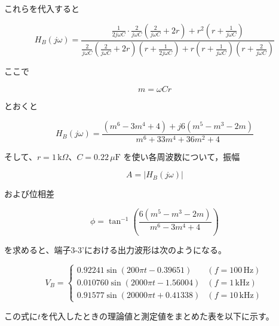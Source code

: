 \documentclass[article]{jlreq}
\begin{document}
これらを代入すると

\begin{equation}
H_B(j\omega)
=
\frac{
\frac1{2j\omega C}
\cdot
\frac2{j\omega C}
\left(
\frac2{j\omega C}+2r
\right)
+
r^2
\left(
r+\frac1{j\omega C}
\right)
}{
\frac2{j\omega C}
\left(
\frac2{j\omega C}+2r
\right)
\left(
r+\frac1{2j\omega C}
\right)
+
r
\left(
r+\frac1{j\omega C}
\right)
\left(
r+\frac2{j\omega C}
\right)
}
\end{equation}

ここで


\begin{equation}
m=\omega Cr
\end{equation}

とおくと

\begin{equation}
H_B(j\omega)
=
\frac{
(m^6-3m^4+4)
+j6(m^5-m^3-2m)
}{
m^6+33m^4+36m^2+4
}
\end{equation}

そして、$r = 1\,\text{k}\Omega$、$C = 0.22\,\mu\text{F}$ を使い各周波数について，振幅

\begin{equation}
A=|H_B(j\omega)|
\end{equation}

および位相差

\begin{equation}
\phi=
\tan^{-1}
\left(
\frac{
6(m^5-m^3-2m)
}{
m^6-3m^4+4
}
\right)
\end{equation}

を求めると、端子3-3'における出力波形は次のようになる。

\begin{equation}
V_B=
\begin{cases}
0.92241\sin(200\pi t-0.39651)
&(f = 100\,\text{Hz})
\\
0.010760\sin(2000\pi t-1.56004)
&(f = 1\,\mathrm{kHz})
\\
0.91577\sin(20000\pi t+0.41338)
&(f = 10\,\mathrm{kHz})
\end{cases}
\end{equation}

この式に$t$を代入したときの理論値と測定値をまとめた表を以下に示す。
\end{document}
